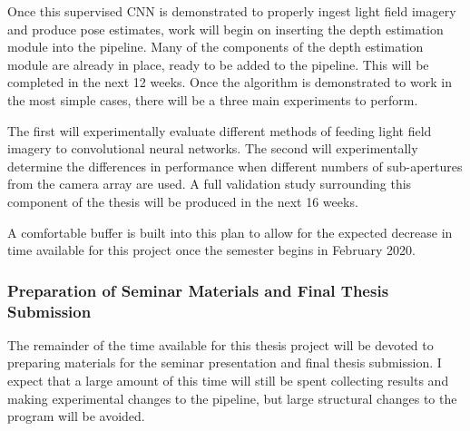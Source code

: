 Once this supervised CNN is demonstrated to properly ingest light field imagery and produce pose estimates, work will begin on inserting the depth estimation module into the pipeline. Many of the components of the depth estimation module are already in place, ready to be added to the pipeline. This will be completed in the next 12 weeks. Once the algorithm is demonstrated to work in the most simple cases, there will be a three main experiments to perform. 

The first will experimentally evaluate different methods of feeding light field imagery to convolutional neural networks. The second will experimentally determine the differences in performance when different numbers of sub-apertures from the camera array are used. A full validation study surrounding this component of the thesis will be produced in the next 16 weeks. 

A comfortable buffer is built into this plan to allow for the expected decrease in time available for this project once the semester begins in February 2020. 

\subsubsection{Preparation of Seminar Materials and Final Thesis Submission}
The remainder of the time available for this thesis project will be devoted to preparing materials for the seminar presentation and final thesis submission. I expect that a large amount of this time will still be spent collecting results and making experimental changes to the pipeline, but large structural changes to the program will be avoided. 

